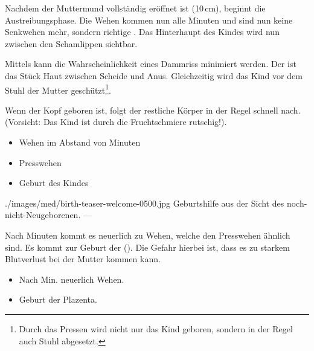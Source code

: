 {
Nachdem der Muttermund vollständig eröffnet ist (10\,cm),
beginnt die Austreibungsphase. Die Wehen kommen nun alle 
Minuten und sind nun keine Senkwehen mehr, sondern richtige . Das
Hinterhaupt des Kindes wird nun zwischen den Schamlippen  sichtbar. 

Mittels  kann die
Wahrscheinlichkeit eines Dammriss minimiert werden. Der  ist das Stück
Haut zwischen Scheide und Anus. Gleichzeitig wird das Kind vor dem Stuhl der
Mutter geschützt\footnote{Durch das Pressen wird nicht nur
das Kind geboren, sondern in der Regel auch Stuhl abgesetzt.}. 

Wenn der Kopf geboren ist, folgt der restliche Körper
in der Regel schnell nach. (Vorsicht: Das Kind ist durch die Fruchtschmiere
rutschig!). 
}{
\begin{itemize}
    \item Wehen im Abstand von  Minuten
    \item Presswehen
    \item Geburt des Kindes
\end{itemize}
}
{./images/med/birth-teaser-welcome-0500.jpg}
{Geburtshilfe aus der Sicht des noch-nicht-Neugeborenen.}
{---}





{
Nach  Minuten kommt es neuerlich zu Wehen, welche den
Presswehen ähnlich sind. Es kommt zur Geburt der 
(). Die Gefahr hierbei ist, dass es zu
starkem Blutverlust bei der Mutter kommen kann.  
}{
\begin{itemize}  
    \item Nach  Min. neuerlich Wehen. 
    \item Geburt der Plazenta.
\end{itemize}
}{}{}{}





